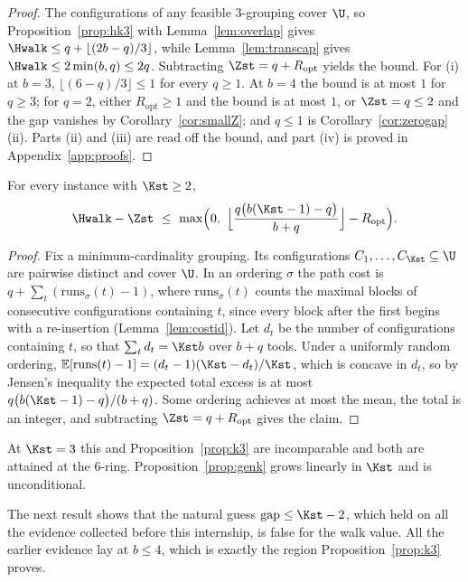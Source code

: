 \begin{proof}
The configurations of any feasible $3$-grouping cover $\U$, so
Proposition~\ref{prop:hk3} with Lemma~\ref{lem:overlap} gives
$\Hwalk\le q+\lfloor(2b-q)/3\rfloor$, while Lemma~\ref{lem:transcap} gives
$\Hwalk\le2\min(b,q)\le 2q$. Subtracting $\Zst=q+R_{\mathrm{opt}}$ yields the bound.
For (i) at $b=3$, $\lfloor(6-q)/3\rfloor\le1$ for every $q\ge1$. At $b=4$ the bound
is at most $1$ for $q\ge3$; for $q=2$, either $R_{\mathrm{opt}}\ge1$ and the bound is
at most $1$, or $\Zst=q\le2$ and the gap vanishes by Corollary~\ref{cor:smallZ}; and
$q\le1$ is Corollary~\ref{cor:zerogap}(ii). Parts (ii) and (iii) are read off the
bound, and part (iv) is proved in Appendix~\ref{app:proofs}.
\end{proof}

\begin{proposition}\label{prop:genk}
For every instance with $\Kst\ge2$,
\[
  \Hwalk-\Zst\ \le\ \max\Bigl(0,\
  \Bigl\lfloor\frac{q\bigl(b(\Kst-1)-q\bigr)}{b+q}\Bigr\rfloor-R_{\mathrm{opt}}\Bigr).
\]
\end{proposition}

\begin{proof}
Fix a minimum-cardinality grouping. Its configurations $C_1,\dots,C_{\Kst}\subseteq\U$
are pairwise distinct and cover $\U$. In an ordering $\sigma$ the path cost is
$q+\sum_t(\mathrm{runs}_\sigma(t)-1)$, where $\mathrm{runs}_\sigma(t)$ counts the
maximal blocks of consecutive configurations containing $t$, since every block after
the first begins with a re-insertion (Lemma~\ref{lem:costid}). Let $d_t$ be the number
of configurations containing $t$, so that $\sum_t d_t=\Kst b$ over $b+q$ tools. Under
a uniformly random ordering,
$\mathbb{E}[\mathrm{runs}(t)-1]=(d_t-1)(\Kst-d_t)/\Kst$, which is concave in $d_t$, so
by Jensen's inequality the expected total excess is at most
$q\bigl(b(\Kst-1)-q\bigr)/(b+q)$. Some ordering achieves at most the mean, the total is
an integer, and subtracting $\Zst=q+R_{\mathrm{opt}}$ gives the claim.
\end{proof}

At $\Kst=3$ this and Proposition~\ref{prop:k3} are incomparable and both are attained
at the $6$-ring. Proposition~\ref{prop:genk} grows linearly in $\Kst$ and is
unconditional.

The next result shows that the natural guess $\mathrm{gap}\le\Kst-2$, which held on
all the evidence collected before this internship, is false for the walk value. All
the earlier evidence lay at $b\le4$, which is exactly the region
Proposition~\ref{prop:k3} proves.

